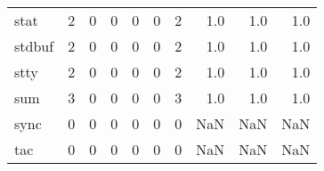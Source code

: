 \begin{longtable}{lrrrrrrrrr}
stat      &                                       2 &                                                  0 &                                                  0 &                                                  0 &                                                  0 &                                                  2 &                                                1.0 &                                    1.0 &                                  1.0 \\
stdbuf    &                                       2 &                                                  0 &                                                  0 &                                                  0 &                                                  0 &                                                  2 &                                                1.0 &                                    1.0 &                                  1.0 \\
stty      &                                       2 &                                                  0 &                                                  0 &                                                  0 &                                                  0 &                                                  2 &                                                1.0 &                                    1.0 &                                  1.0 \\
sum       &                                       3 &                                                  0 &                                                  0 &                                                  0 &                                                  0 &                                                  3 &                                                1.0 &                                    1.0 &                                  1.0 \\
sync      &                                       0 &                                                  0 &                                                  0 &                                                  0 &                                                  0 &                                                  0 &                                                NaN &                                    NaN &                                  NaN \\
tac       &                                       0 &                                                  0 &                                                  0 &                                                  0 &                                                  0 &                                                  0 &                                                NaN &                                    NaN &                                  NaN \\

\end{longtable}
